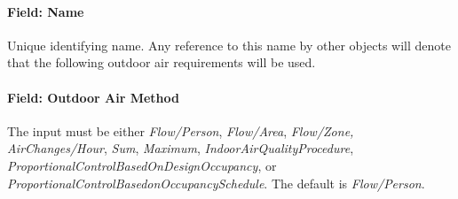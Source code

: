 \paragraph{Field: Name}\label{field-name-011}

Unique identifying name. Any reference to this name by other objects will denote that the following outdoor air requirements will be used.

\paragraph{Field: Outdoor Air Method}\label{field-outdoor-air-method}

The input must be either \emph{Flow/Person}, \emph{Flow/Area}, \emph{Flow/Zone, AirChanges/Hour}, \emph{Sum}, \emph{Maximum}, \emph{IndoorAirQualityProcedure}, \emph{ProportionalControlBasedOnDesignOccupancy}, or \emph{ProportionalControlBasedonOccupancySchedule}. The default is \emph{Flow/Person}.
